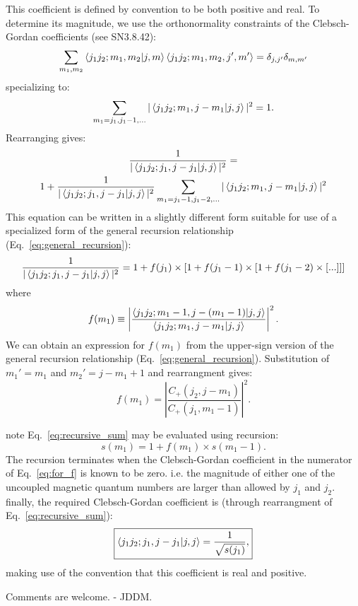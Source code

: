 \documentclass[11pt]{article}
\begin{document}
\begin{outline}
This coefficient is defined by convention to be both positive and real.  To determine its magnitude, we use the orthonormality constraints of the Clebsch-Gordan coefficients (see SN3.8.42):
\begin{equation}
\sum_{m_1,m_2} \braket{j_1j_2;m_1,m_2|j,m}
\braket{j_1j_2;m_1,m_2,j',m'} = \delta_{j,j'} \delta_{m,m'}
\end{equation}
specializing to:
\begin{equation}
\sum_{m_1=j_1, j_1-1, ...} |\braket{j_1j_2;m_1,j-m_1|j,j}|^2 = 1.
\end{equation}
Rearranging gives:
\begin{multline}
\frac{1}{|\braket{j_1j_2;j_1,j-j_1|j,j}|^2}
  = \\ 1 + \frac{1}{|\braket{j_1j_2;j_1,j-j_1|j,j}|^2}
\sum_{m_1=j_1-1, j_1-2, ...}
|\braket{j_1j_2;m_1,j-m_1|j,j}|^2
\end{multline}
This equation can be written in a slightly different form suitable for use of a specialized form of the general recursion relationship (Eq.~\ref{eq:general_recursion}):
\begin{equation}
\frac{1}{|\braket{j_1j_2;j_1,j-j_1|j,j}|^2}
  = 1 + f(j_1) \times [1 + f(j_1-1) \times [ 1 + f(j_1-2) \times [  ... ]]]
\label{eq:recursive_sum}
\end{equation}
where
\begin{equation}
f(m_1) \equiv \left| 
  \frac{
  \braket{j_1j_2;m_1-1,j-(m_1-1)|j,j}
  }{
  \braket{j_1j_2;m_1,j-m_1|j,j}}
  \right|^2 .
\end{equation}
We can obtain an expression for $f(m_1)$ from the upper-sign version of the general recursion relationship (Eq.~\ref{eq:general_recursion}). Substitution of 
$m_1'= m_1$ and $m_2'= j-m_1+1$ and rearrangment gives:
\begin{equation}
\boxed{
f(m_1)
 = \left|
\frac{C_+(j_2,j-m_1)}{C_+(j_1,m_1-1)}
   \right|^2 .
}
\label{eq:for_f}
\end{equation}

\1 note Eq.~\ref{eq:recursive_sum} may be evaluated using recursion:
\begin{equation}
\boxed{
s(m_1) = 1 + f(m_1) \times s(m_1-1).
}
\end{equation}
The recursion terminates when the Clebsch-Gordan
coefficient in the numerator of Eq.~\ref{eq:for_f}
is known to be zero.  i.e. the magnitude of either one of the uncoupled magnetic quantum numbers are larger than allowed by $j_1$ and $j_2$.
\1 finally, the required Clebsch-Gordan coefficient is (through rearrangment of Eq.~\ref{eq:recursive_sum}):
\begin{equation}
\boxed{
\braket{j_1j_2;j_1,j-j_1|j,j} = \frac{1}{\sqrt{s(j_1)}},
}
\end{equation}
making use of the convention that this coefficient is real and positive.
\end{outline}

Comments are welcome. - JDDM.
\end{document}
